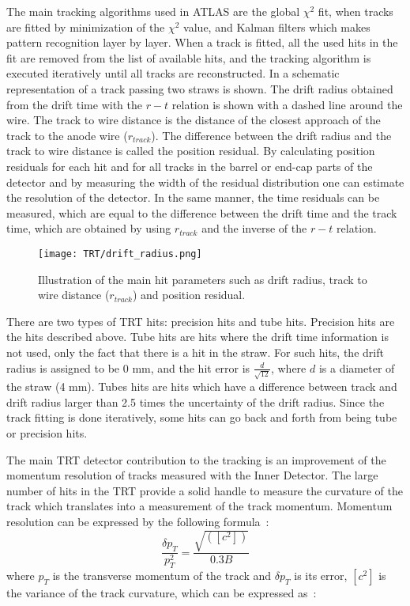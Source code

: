 The main tracking algorithms used in ATLAS are the global $\chi^2$ fit, when tracks are fitted by minimization of the $\chi^2$ value, and Kalman filters which makes pattern recognition
layer by layer. When a track is fitted, all the used hits in the fit are removed from the list of available hits, and the tracking algorithm is executed iteratively until all tracks are reconstructed.
In  a schematic representation of a track passing two straws is shown. The drift radius obtained from the drift time with the $r-t$ relation is
shown with a dashed line around the wire. The track to wire distance is the distance of the closest approach of the track to the anode wire ($r_{track}$). The difference
between the drift radius and the track to wire distance is called the position residual. By calculating position residuals for each hit and for all
tracks in the barrel or end-cap parts of the detector and by measuring the width of the residual distribution one can estimate the resolution of the detector.
In the same manner, the time residuals can be measured, which are equal to the difference between the drift time and the track time, which are obtained by using $r_{track}$ and the inverse of the
$r-t$ relation.


\begin{figure}
\centering
\texttt{[image: TRT/drift\_radius.png]}
\caption{ 
 Illustration of the main hit parameters such as drift radius, track to wire distance ($r_{track}$) and position residual.
}
\label{fig:drift_radius}
\end{figure}

There are two types of TRT hits: precision hits and tube hits. Precision hits are the hits described above. Tube hits are hits where the drift time 
information is not used, only the fact that there is a hit in the straw. For such hits, the drift radius is assigned to be 0 mm, and the hit error is $\frac{d}{\sqrt{12}}$, where
$d$ is a diameter of the straw (4 mm). Tubes hits are hits which have a difference between track and drift radius larger than
2.5 times the uncertainty of the drift radius. Since the track fitting is done iteratively, some hits can go back and forth from being tube or precision hits.

The main TRT detector contribution to the tracking is an improvement of the momentum resolution of tracks measured with the Inner Detector. The large number of hits in the TRT provide
a solid handle to measure the curvature of the track which translates into a measurement of the track momentum. Momentum resolution can be expressed by the following formula~\cite{mom_res_book,Gluckstern:1963ng}:
\begin{equation}
\dfrac{\delta p_T}{p_T^2} = \dfrac{\sqrt{([c^2])}}{0.3B}
 \label{eq:momentum_resolution}
\end{equation}
where $p_T$ is the transverse momentum of the track and $\delta p_T$ is its error, $[c^2]$ is the variance of the track curvature, which can be expressed as~\cite{mom_res_book}:

